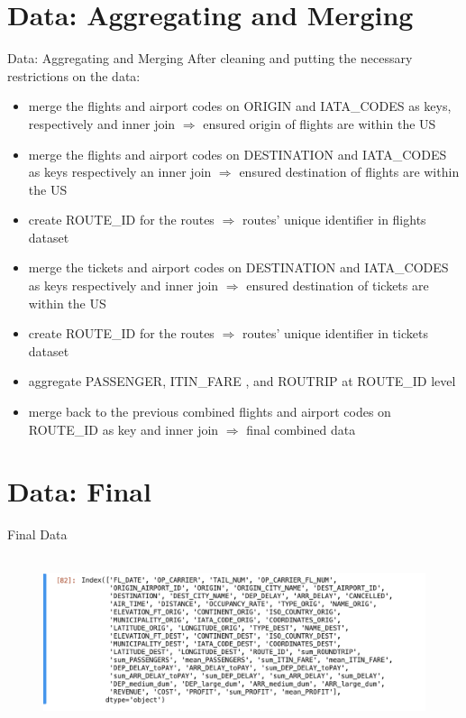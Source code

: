 \documentclass[aspectratio=1610]{beamer}
\begin{document}
\section{Data: Aggregating and Merging}
\begin{frame}{Data: Aggregating and Merging}
	After cleaning and putting the necessary restrictions on the data:
		\vspace{0.2cm}
	\begin{itemize}
		\item merge the flights and airport codes on ORIGIN and IATA\_CODES as keys, respectively and inner join $\Longrightarrow$ ensured origin of flights are within the US
			\vspace{0.2cm}
		\item merge the flights and airport codes on DESTINATION and IATA\_CODES  as keys respectively an inner join $\Longrightarrow$ ensured destination of flights are within the US
			\vspace{0.2cm}
		\item create ROUTE\_ID for the routes $\Longrightarrow$ routes' unique identifier  in flights dataset
			\vspace{0.2cm}
		\item merge  the tickets and airport codes on DESTINATION and IATA\_CODES as keys respectively and inner join $\Longrightarrow$ ensured destination of tickets are within the US
					\vspace{0.2cm}
		\item create ROUTE\_ID for the routes $\Longrightarrow$ routes' unique identifier  in tickets dataset
			\vspace{0.2cm}
		\item aggregate PASSENGER, ITIN\_FARE , and ROUTRIP at ROUTE\_ID level
			\vspace{0.2cm}
		\item merge back to the previous  combined flights and airport codes on ROUTE\_ID as key and inner join $\Longrightarrow$ final combined data
	\end{itemize}
\end{frame}

\section{Data: Final}
\begin{frame}{Final Data}
	\begin{figure}[htp!]
		\begin{center}
			\includegraphics[height=5cm, width= 12cm]{finalData} 
			\caption{ }
			\label{finalData}
		\end{center}
	\end{figure}
\end{frame}
\end{document}
